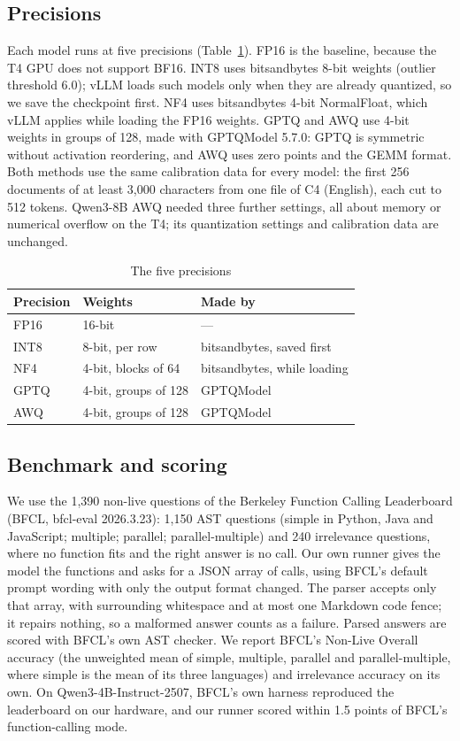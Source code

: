 \documentclass[conference]{IEEEtran}
\begin{document}
\subsection{Precisions}
Each model runs at five precisions (Table~\ref{tab:precisions}). FP16 is the baseline, because the
T4 GPU does not support BF16. INT8 uses bitsandbytes 8-bit weights (outlier threshold 6.0); vLLM
loads such models only when they are already quantized, so we save the checkpoint first. NF4 uses
bitsandbytes 4-bit NormalFloat, which vLLM applies while loading the FP16 weights. GPTQ and AWQ
use 4-bit weights in groups of 128, made with GPTQModel 5.7.0: GPTQ is symmetric without activation
reordering, and AWQ uses zero points and the GEMM format. Both methods use the same calibration
data for every model: the first 256 documents of at least 3,000 characters from one file of
C4 (English), each cut to 512 tokens. Qwen3-8B AWQ needed three further settings, all about memory
or numerical overflow on the T4; its quantization settings and calibration data are unchanged.

\begin{table}[t]
\centering
\caption{The five precisions}\label{tab:precisions}
\begin{tabular}{lll}
\toprule
Precision & Weights & Made by \\
\midrule
FP16 & 16-bit & --- \\
INT8 & 8-bit, per row & bitsandbytes, saved first \\
NF4  & 4-bit, blocks of 64 & bitsandbytes, while loading \\
GPTQ & 4-bit, groups of 128 & GPTQModel \\
AWQ  & 4-bit, groups of 128 & GPTQModel \\
\bottomrule
\end{tabular}
\end{table}

\subsection{Benchmark and scoring}
We use the 1,390 non-live questions of the Berkeley Function Calling Leaderboard (BFCL, bfcl-eval
2026.3.23): 1,150 AST questions (simple in Python, Java and JavaScript; multiple; parallel;
parallel-multiple) and 240 irrelevance questions, where no function fits and the right answer is
no call. Our own runner gives the model the functions and asks for a JSON array of calls, using
BFCL's default prompt wording with only the output format changed. The parser accepts only that
array, with surrounding whitespace and at most one Markdown code fence; it repairs nothing, so a
malformed answer counts as a failure. Parsed answers are scored with BFCL's own AST checker. We
report BFCL's Non-Live Overall accuracy (the unweighted mean of simple, multiple, parallel and
parallel-multiple, where simple is the mean of its three languages) and irrelevance accuracy on its
own. On Qwen3-4B-Instruct-2507, BFCL's own harness reproduced the leaderboard on our hardware, and
our runner scored within 1.5 points of BFCL's function-calling mode.
\end{document}
